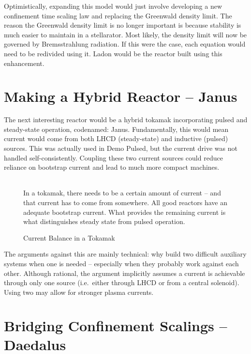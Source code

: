 Optimistically, expanding this model would just involve developing a new confinement time scaling law and replacing the Greenwald density limit. The reason the Greenwald density limit is no longer important is because stability is much easier to maintain in a stellarator. Most likely, the density limit will now be governed by Bremsstrahlung radiation. If this were the case, each equation would need to be redivided using it. Ladon would be the reactor built using this enhancement.

\section{Making a Hybrid Reactor -- Janus}

The next interesting reactor would be a hybrid tokamak incorporating pulsed and steady-state operation, codenamed: Janus. Fundamentally, this would mean current would come from both LHCD (steady-state) and inductive (pulsed) sources. This was actually used in Demo Pulsed, but the current drive was not handled self-consistently. Coupling these two current sources could reduce reliance on bootstrap current and lead to much more compact machines.

\begin{figure}
	\centering
	\begin{adjustbox}{width=0.75\textwidth}
		
	\end{adjustbox}
	\caption{Current Balance in a Tokamak} ~\\
	\small In a tokamak, there needs to be a certain amount of current -- and that current has to come from somewhere. All good reactors have an adequate bootstrap current. What provides the remaining current is what distinguishes steady state from pulsed operation.
\end{figure}

The arguments against this are mainly technical: why build two difficult auxiliary systems when one is needed -- especially when they probably work against each other. Although rational, the argument implicitly assumes a current is achievable through only one source (i.e.\ either through LHCD or from a central solenoid). Using two may allow for stronger plasma currents.

\section{Bridging Confinement Scalings -- Daedalus}

